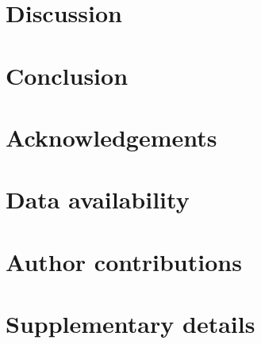 \documentclass[11pt, a4paper]{article}
\begin{document}
\section{Discussion}\label{sec:discussion}

\section{Conclusion}\label{sec:conclusion}

\section*{Acknowledgements}

\section*{Data availability}

\section*{Author contributions}

\printbibliography

\appendix
\section{Supplementary details}\label{app:details}
\end{document}
